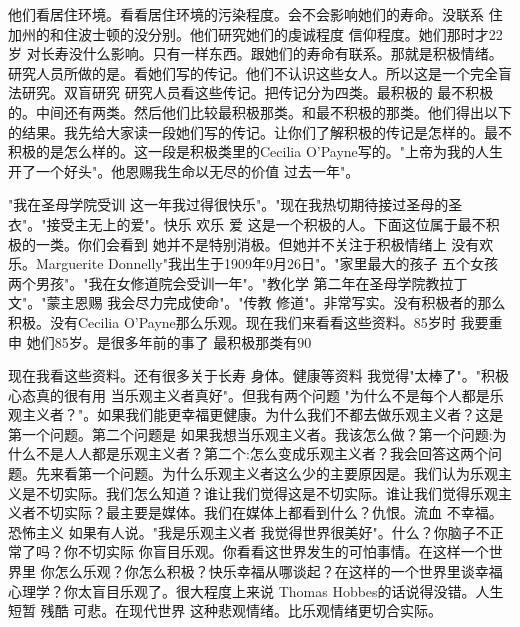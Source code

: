 他们看居住环境。看看居住环境的污染程度。会不会影响她们的寿命。没联系 住加州的和住波士顿的没分别。他们研究她们的虔诚程度 信仰程度。她们那时才22岁 对长寿没什么影响。只有一样东西。跟她们的寿命有联系。那就是积极情绪。研究人员所做的是。看她们写的传记。他们不认识这些女人。所以这是一个完全盲法研究。双盲研究 研究人员看这些传记。把传记分为四类。最积极的 最不积极的。中间还有两类。然后他们比较最积极那类。和最不积极的那类。他们得出以下的结果。我先给大家读一段她们写的传记。让你们了解积极的传记是怎样的。最不积极的是怎么样的。这一段是积极类里的Cecilia O'Payne写的。"上帝为我的人生开了一个好头"。他恩赐我生命以无尽的价值 过去一年"。 

"我在圣母学院受训 这一年我过得很快乐"。"现在我热切期待接过圣母的圣衣"。"接受主无上的爱"。快乐 欢乐 爱 这是一个积极的人。下面这位属于最不积极的一类。你们会看到 她并不是特别消极。但她并不关注于积极情绪上 没有欢乐。Marguerite Donnelly"我出生于1909年9月26日"。"家里最大的孩子 五个女孩 两个男孩"。"我在女修道院会受训一年"。"教化学 第二年在圣母学院教拉丁文"。"蒙主恩赐 我会尽力完成使命"。"传教 修道"。非常写实。没有积极者的那么积极。没有Cecilia O'Payne那么乐观。现在我们来看看这些资料。85岁时 我要重申 她们85岁。是很多年前的事了 最积极那类有90%

现在我看这些资料。还有很多关于长寿 身体。健康等资料 我觉得"太棒了"。"积极心态真的很有用 当乐观主义者真好"。但我有两个问题 "为什么不是每个人都是乐观主义者？"。如果我们能更幸福更健康。为什么我们不都去做乐观主义者？这是第一个问题。第二个问题是 如果我想当乐观主义者。我该怎么做？第一个问题:为什么不是人人都是乐观主义者？第二个:怎么变成乐观主义者？我会回答这两个问题。先来看第一个问题。为什么乐观主义者这么少的主要原因是。我们认为乐观主义是不切实际。我们怎么知道？谁让我们觉得这是不切实际。谁让我们觉得乐观主义者不切实际？最主要是媒体。我们在媒体上都看到什么？仇恨。流血 不幸福。恐怖主义 如果有人说。"我是乐观主义者 我觉得世界很美好"。什么？你脑子不正常了吗？你不切实际 你盲目乐观。你看看这世界发生的可怕事情。在这样一个世界里 你怎么乐观？你怎么积极？快乐幸福从哪谈起？在这样的一个世界里谈幸福心理学？你太盲目乐观了。很大程度上来说 Thomas Hobbes的话说得没错。人生短暂 残酷 可悲。在现代世界 这种悲观情绪。比乐观情绪更切合实际。 

